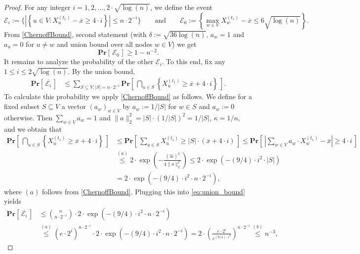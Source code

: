 \documentclass[twoside,leqno]{article}
\newcommand{\Pro}[1]{\mathbf{Pr} \left[\,#1\,\right]}
\DeclareMathOperator{\1}{\mathbf{1}}
\numberwithin{equation}{section}
\begin{document}
\begin{proof}
For any integer $i=1,2,\ldots,2\cdot \sqrt{\log(n)} $, we define the event
\[
\mathcal{E}_i := \biggl\{ \left| \left\{ u \in V \colon X_u^{(t_1)} - \overline{x} \geq 4\cdot i \right\} \right| \le n \cdot 2^{-i} \biggr\} \qquad \text{and} \qquad \mathcal{E}_0 := \left\{  \max_{w\in V}X_{w}^{(t_1)} -\overline{x} \le 6 \sqrt{\log(n)} \right \}.
\]
From \cref{ChernoffBound}, second statement (with $\delta:=\sqrt{36\log(n)}$, $a_w=1$ and $a_u=0$ for $u\neq w$ and union bound over all nodes $w\in V$) we get
\[
\Pro{ \mathcal{E}_0 } \geq 1 - n^{-2}.
\] 
It remains to analyze the probability of the other $\mathcal{E}_i$. To this end, fix any $1 \leq i \leq 2\sqrt{\log(n)} $. By the union bound,
\begin{align}
\Pro{ \overline{\mathcal{E}_i }} &\leq \sum_{S \subseteq V \colon |S| = n \cdot 2^{-i}}
\Pro{ \bigcap_{u \in S} \left\{ X_u^{(t_1)} \geq \overline{x} + 4 \cdot i \right\} }. \label{eq:union_bound}
\end{align}
To calculate this probability we apply \cref{ChernoffBound} as follows.
We define for a fixed subset $S \subseteq V$ a vector $(a_w)_{w \in V}$ by $a_w := 1/|S|$ for $w \in S$ and $a_w := 0$ otherwise. Then $\sum_{w \in V} a_w =1$ and $\|a\|_2^2 = |S| \cdot (1/|S|)^2 = 1/|S|$, $\kappa=1/n$, and we obtain that
\begin{align*}
\Pro{ \bigcap_{u \in S} \left\{ X_u^{(t_1)} \geq \overline{x} \!+\! 4 \cdot i \right\} } \!&\leq \Pro{\sum_{u \in S} X_u^{(t_1)} \geq |S| \cdot \left( \overline{x} + 4 \cdot i \right) } \leq
\Pro{ \left| \sum_{w \in V} a_w \cdot X_w^{(t_1)} - \overline{x} \right| \geq 4 \cdot i} \\
&\stackrel{(a)}{\leq} 2 \cdot \exp\left( - \frac{ (3 i)^2}{ 4 \| a \|_2^2} \right) \leq 2 \cdot \exp\left( - (9/4) \cdot  i^2 \cdot |S| \right) 
\\&= 2 \cdot \exp\left( - (9/4) \cdot  i^2 \cdot n \cdot 2^{-i} \right),
\end{align*}
where $(a)$ follows from \cref{ChernoffBound}. Plugging this into \cref{eq:union_bound} yields
\begin{align*}
\Pro {\overline{\mathcal{E}_i }} &\leq \binom{n}{n \cdot 2^{-i}} \cdot 2 \cdot \exp\left( - (9/4)\cdot  i^2 \cdot n \cdot 2^{-i} \right) \\&\stackrel{(a)}{\leq} \left( e \cdot 2^{i} \right)^{ n \cdot 2^{-i}} \cdot 2 \cdot \exp\left( - (9/4)\cdot  i^2 \cdot n \cdot 2^{-i} \right)
= 2 \cdot \left( \frac{e \cdot 2^{i}}{ e^{(9/4)\cdot i^2} } \right)^{ n \cdot 2^{-i}} \stackrel{(b)}{\leq} n^{-3},

\end{align*}
\end{proof}
\end{document}
